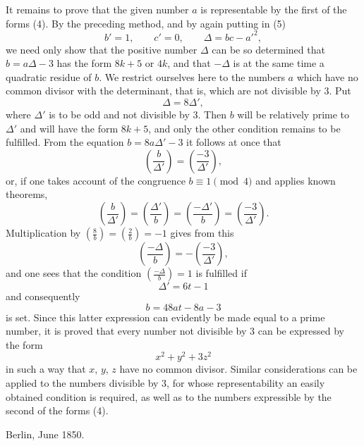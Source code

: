\documentclass[11pt]{article}
\newcommand{\leg}[2]{\left(\frac{#1}{#2}\right)}
\begin{document}
It remains to prove that the given number $a$ is representable by the first of the forms (4). By the preceding method, and by again putting in (5)
\[
 b'=1,\qquad c'=0,\qquad \Delta=bc-a'^2,
\]
we need only show that the positive number $\Delta$ can be so determined that $b=a\Delta-3$ has the form $8k+5$ or $4k$, and that $-\Delta$ is at the same time a quadratic residue of $b$. We restrict ourselves here to the numbers $a$ which have no common divisor with the determinant, that is, which are not divisible by $3$. Put
\[
 \Delta=8\Delta',
\]
where $\Delta'$ is to be odd and not divisible by $3$. Then $b$ will be relatively prime to $\Delta'$ and will have the form $8k+5$, and only the other condition remains to be fulfilled. From the equation $b=8a\Delta'-3$ it follows at once that
\[
 \leg{b}{\Delta'}=\leg{-3}{\Delta'},
\]
or, if one takes account of the congruence $b\equiv1\pmod 4$ and applies known theorems,
\[
 \leg{b}{\Delta'}=\leg{\Delta'}{b}=\leg{-\Delta'}{b}=\leg{-3}{\Delta'}.
\]
Multiplication by $\leg{8}{b}=\leg{2}{b}=-1$ gives from this
\[
 \leg{-\Delta}{b}=-\leg{-3}{\Delta'},
\]
and one sees that the condition $\leg{-\Delta}{b}=1$ is fulfilled if
\[
 \Delta'=6t-1
\]
and consequently
\[
 b=48at-8a-3
\]
is set. Since this latter expression can evidently be made equal to a prime number, it is proved that every number not divisible by $3$ can be expressed by the form
\[
 x^2+y^2+3z^2
\]
in such a way that $x$, $y$, $z$ have no common divisor. Similar considerations can be applied to the numbers divisible by $3$, for whose representability an easily obtained condition is required, as well as to the numbers expressible by the second of the forms (4).

\begin{flushright}
Berlin, June 1850.
\end{flushright}
\end{document}
